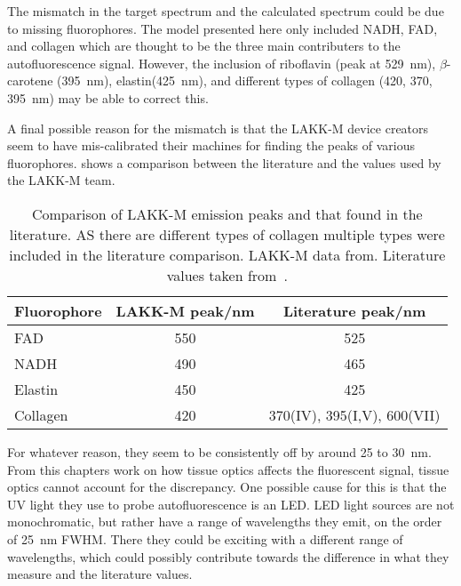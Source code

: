 The mismatch in the target spectrum and the calculated spectrum could be due to missing fluorophores. 
The model presented here only included NADH, FAD, and collagen which are thought to be the three main contributers to the autofluorescence signal.
However, the inclusion of riboflavin (peak at 529~nm), $\beta$-carotene (395~nm), elastin(425~nm), and different types of collagen (420, 370, 395~nm) may be able to correct this.

A final possible reason for the mismatch is that the LAKK-M device creators seem to have mis-calibrated their machines for finding the peaks of various fluorophores.
 shows a comparison between the literature and the values used by the LAKK-M team.

\begin{table}[!htbp]
  \centering

  \begin{tabular}{l|cc}

  \hline
  Fluorophore & LAKK-M peak/nm & Literature peak/nm \\
  \hline
   FAD  & 550& 525\\
   NADH  & 490& 465\\
   Elastin  & 450& 425\\
   Collagen  & 420 & 370(IV), 395(I,V), 600(VII)\\

  \hline

  \end{tabular}
  \caption{Comparison of LAKK-M emission peaks and that found in the literature. AS there are different types of collagen multiple types were included in the literature comparison. LAKK-M data from\cite{palmer2016changes,dunaev2015individual,smirnova2012collagen,palmer2016development}. Literature values taken from~\cite{dacosta2003molecular,pan2015detection,islam2013ph,patterson2000separation}.}
  \label{tab:flurocompvalues}

\end{table}

For whatever reason, they seem to be consistently off by around 25 to 30~nm.
From this chapters work on how tissue optics affects the fluorescent signal, tissue optics cannot account for the discrepancy.
One possible cause for this is that the UV light they use to probe autofluorescence is an LED.
LED light sources are not monochromatic, but rather have a range of wavelengths they emit, on the order of 25~nm FWHM.
There they could be exciting with a different range of wavelengths, which could possibly contribute towards the difference in what they measure and the literature values.

